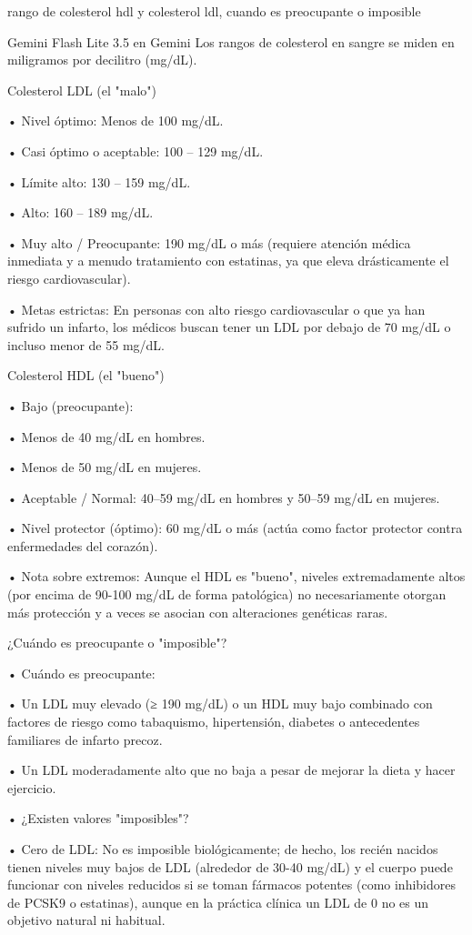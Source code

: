 \documentclass[12pt,a4paper,oneside]{book}
\begin{document}
\begin{iaprompt}
rango de colesterol hdl y colesterol ldl, cuando es preocupante o imposible
\end{iaprompt}
\begin{iaresp}{Gemini Flash Lite 3.5 en Gemini}
Los rangos de colesterol en sangre se miden en miligramos por decilitro (mg/dL).

Colesterol LDL (el "malo")

• Nivel óptimo: Menos de 100 mg/dL.

• Casi óptimo o aceptable: 100 – 129 mg/dL.

• Límite alto: 130 – 159 mg/dL.

• Alto: 160 – 189 mg/dL.

• Muy alto / Preocupante: 190 mg/dL o más (requiere atención médica inmediata y a menudo tratamiento con estatinas, ya que eleva drásticamente el riesgo cardiovascular).

• Metas estrictas: En personas con alto riesgo cardiovascular o que ya han sufrido un infarto, los médicos buscan tener un LDL por debajo de 70 mg/dL o incluso menor de 55 mg/dL.

Colesterol HDL (el "bueno")

• Bajo (preocupante):

	• Menos de 40 mg/dL en hombres.
    
	• Menos de 50 mg/dL en mujeres.
    
• Aceptable / Normal: 40–59 mg/dL en hombres y 50–59 mg/dL en mujeres.

• Nivel protector (óptimo): 60 mg/dL o más (actúa como factor protector contra enfermedades del corazón).

• Nota sobre extremos: Aunque el HDL es "bueno", niveles extremadamente altos (por encima de 90-100 mg/dL de forma patológica) no necesariamente otorgan más protección y a veces se asocian con alteraciones genéticas raras.

¿Cuándo es preocupante o "imposible"?

• Cuándo es preocupante:

	• Un LDL muy elevado (≥ 190 mg/dL) o un HDL muy bajo combinado con factores de riesgo como tabaquismo, hipertensión, diabetes o antecedentes familiares de infarto precoz.

	• Un LDL moderadamente alto que no baja a pesar de mejorar la dieta y hacer ejercicio.
    
• ¿Existen valores "imposibles"?

	• Cero de LDL: No es imposible biológicamente; de hecho, los recién nacidos tienen niveles muy bajos de LDL (alrededor de 30-40 mg/dL) y el cuerpo puede funcionar con niveles reducidos si se toman fármacos potentes (como inhibidores de PCSK9 o estatinas), aunque en la práctica clínica un LDL de 0 no es un objetivo natural ni habitual.
    

\end{iaresp}
\end{document}
